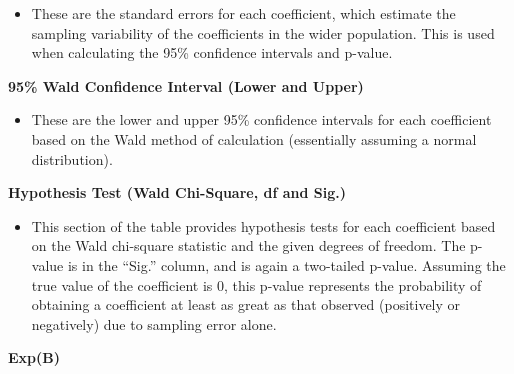 \documentclass[
]{book}
\providecommand{\tightlist}{%
  \setlength{\itemsep}{0pt}\setlength{\parskip}{0pt}}
\begin{document}
\begin{itemize}
\tightlist
\item
  These are the standard errors for each coefficient, which estimate the sampling variability of the coefficients in the wider population. This is used when calculating the 95\% confidence intervals and p-value.
\end{itemize}

\textbf{95\% Wald Confidence Interval (Lower and Upper)}

\begin{itemize}
\tightlist
\item
  These are the lower and upper 95\% confidence intervals for each coefficient based on the Wald method of calculation (essentially assuming a normal distribution).
\end{itemize}

\textbf{Hypothesis Test (Wald Chi-Square, df and Sig.)}

\begin{itemize}
\tightlist
\item
  This section of the table provides hypothesis tests for each coefficient based on the Wald chi-square statistic and the given degrees of freedom. The p-value is in the ``Sig.'' column, and is again a two-tailed p-value. Assuming the true value of the coefficient is 0, this p-value represents the probability of obtaining a coefficient at least as great as that observed (positively or negatively) due to sampling error alone.
\end{itemize}

\textbf{Exp(B)}
\end{document}
